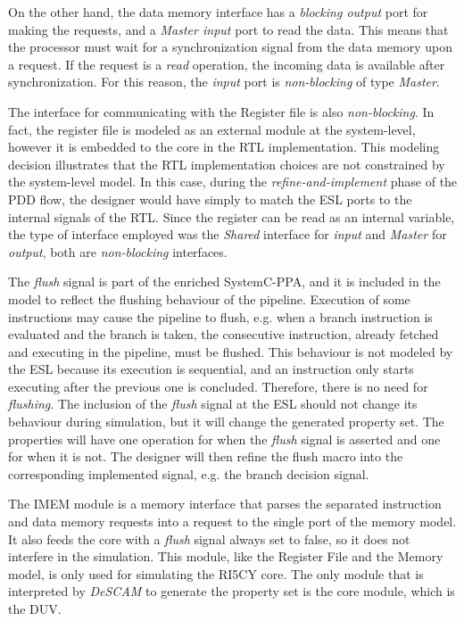 On the other hand, the data memory interface has a \textit{blocking output} port for making the requests, and a \textit{Master input} port to read the data. This means that the processor must wait for a synchronization signal from the data memory upon a request. If the request is a \textit{read} operation, the incoming data is available after synchronization. For this reason, the \textit{input} port is \textit{non-blocking} of type \textit{Master}.

The interface for communicating with the Register file is also \textit{non-blocking}. In fact, the register file is modeled as an external module at the system-level, however it is embedded to the core in the RTL implementation. This modeling decision illustrates that the RTL implementation choices are not constrained by the system-level model. In this case, during the \textit{refine-and-implement} phase of the PDD flow, the designer would have simply to match the ESL ports to the internal signals of the RTL. Since the register can be read as an internal variable, the type of interface employed was the \textit{Shared} interface for \textit{input} and \textit{Master} for \textit{output}, both are \textit{non-blocking} interfaces.

The \textit{flush} signal is part of the enriched SystemC-PPA, and it is included in the model to reflect the flushing behaviour of the pipeline. Execution of some instructions may cause the pipeline to flush, e.g. when a branch instruction is evaluated and the branch is taken, the consecutive instruction, already fetched and executing in the pipeline, must be flushed. This behaviour is not modeled by the ESL because its execution is sequential, and an instruction only starts executing after the previous one is concluded. Therefore, there is no need for \textit{flushing}. The inclusion of the \textit{flush} signal at the ESL should not change its behaviour during simulation, but it will change the generated property set. The properties will have one operation for when the \textit{flush} signal is asserted and one for when it is not. The designer will then refine the flush macro into the corresponding implemented signal, e.g. the branch decision signal. 

The IMEM module is a memory interface that parses the separated instruction and data memory requests into a request to the single port of the memory model. It also feeds the core with a \textit{flush} signal always set to false, so it does not interfere in the simulation. This module, like the Register File and the Memory model, is only used for simulating the RI5CY core. The only module that is interpreted by \textit{DeSCAM} to generate the property set is the core module, which is the DUV.

